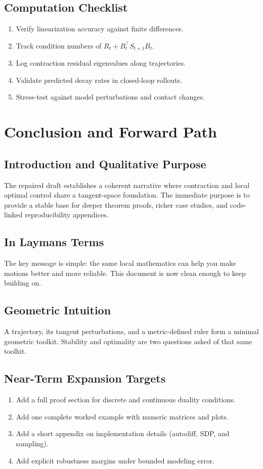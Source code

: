 \documentclass[11pt,letterpaper]{article}
\begin{document}
\subsection{Computation Checklist}
\begin{enumerate}[label=\arabic*.]
\item Verify linearization accuracy against finite differences.
\item Track condition numbers of $R_t + B_t^\top S_{t+1}B_t$.
\item Log contraction residual eigenvalues along trajectories.
\item Validate predicted decay rates in closed-loop rollouts.
\item Stress-test against model perturbations and contact changes.
\end{enumerate}

\section{Conclusion and Forward Path}

\subsection{Introduction and Qualitative Purpose}
The repaired draft establishes a coherent narrative where contraction and local optimal control share a tangent-space foundation. The immediate purpose is to provide a stable base for deeper theorem proofs, richer case studies, and code-linked reproducibility appendices.

\subsection{In Laymans Terms}
The key message is simple: the same local mathematics can help you make motions better and more reliable. This document is now clean enough to keep building on.

\subsection{Geometric Intuition}
A trajectory, its tangent perturbations, and a metric-defined ruler form a minimal geometric toolkit. Stability and optimality are two questions asked of that same toolkit.

\subsection{Near-Term Expansion Targets}
\begin{enumerate}[label=\arabic*.]
\item Add a full proof section for discrete and continuous duality conditions.
\item Add one complete worked example with numeric matrices and plots.
\item Add a short appendix on implementation details (autodiff, SDP, and sampling).
\item Add explicit robustness margins under bounded modeling error.
\end{enumerate}
\end{document}
